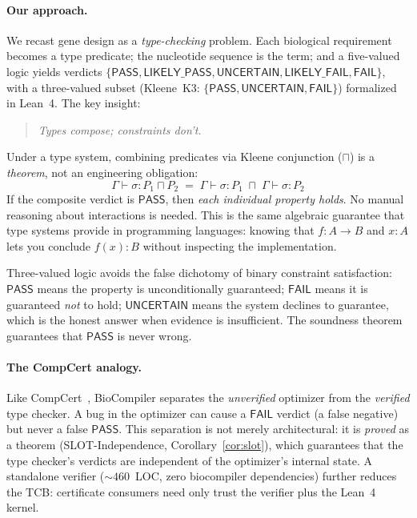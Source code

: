 \documentclass[acmsmall,review,anonymous]{acmart}
\newcommand{\PASS}{\ensuremath{\mathsf{PASS}}\xspace}
\newcommand{\FAIL}{\ensuremath{\mathsf{FAIL}}\xspace}
\newcommand{\UNCERTAIN}{\ensuremath{\mathsf{UNCERTAIN}}\xspace}
\newcommand{\LIKELYPASS}{\ensuremath{\mathsf{LIKELY\_PASS}}\xspace}
\newcommand{\LIKELYFAIL}{\ensuremath{\mathsf{LIKELY\_FAIL}}\xspace}
\newcommand{\seq}{\sigma}
\newcommand{\pred}{P}
\newcommand{\judg}[3]{#1 \vdash #2 : #3}
\begin{document}
\paragraph{Our approach.}
We recast gene design as a \emph{type-checking} problem.
Each biological requirement becomes a type predicate; the nucleotide
sequence is the term; and a five-valued logic yields
verdicts $\{\PASS, \LIKELYPASS, \UNCERTAIN, \LIKELYFAIL, \FAIL\}$,
with a three-valued subset (Kleene~K3: $\{\PASS, \UNCERTAIN, \FAIL\}$)
formalized in Lean~4.
The key insight:

\begin{quote}
\emph{Types compose; constraints don't.}
\end{quote}

\noindent Under a type system, combining predicates via Kleene
conjunction ($\sqcap$) is a \emph{theorem}, not an engineering
obligation:
\[
  \judg{\Gamma}{\seq}{\pred_1 \sqcap \pred_2}
  \;=\;
  \judg{\Gamma}{\seq}{\pred_1} \;\sqcap\;
  \judg{\Gamma}{\seq}{\pred_2}
\]
If the composite verdict is \PASS, then \emph{each individual property
holds}. No manual reasoning about interactions is needed. This is the
same algebraic guarantee that type systems provide in programming
languages: knowing that $f : A \to B$ and $x : A$ lets you conclude
$f(x) : B$ without inspecting the implementation.

Three-valued logic avoids the false dichotomy of binary constraint
satisfaction: \PASS{} means the property is unconditionally guaranteed;
\FAIL{} means it is guaranteed \emph{not} to hold; \UNCERTAIN{} means
the system declines to guarantee, which is the honest answer when
evidence is insufficient.
The soundness theorem guarantees that \PASS{} is never wrong.

\paragraph{The CompCert analogy.}
Like CompCert~\cite{leroy2009compcert}, BioCompiler separates the
\emph{unverified} optimizer from the \emph{verified} type checker.
A bug in the optimizer can cause a \FAIL{} verdict (a false negative)
but never a false \PASS.
This separation is not merely architectural: it is \emph{proved} as a
theorem (SLOT-Independence, Corollary~\ref{cor:slot}), which
guarantees that the type checker's verdicts are independent of the
optimizer's internal state.
A standalone verifier (${\sim}460$~LOC, zero biocompiler dependencies)
further reduces the TCB: certificate consumers need only trust the
verifier plus the Lean~4 kernel.
\end{document}
